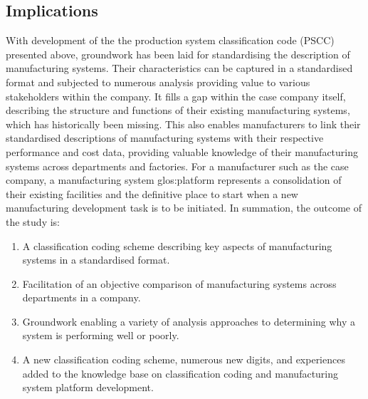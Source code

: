 \subsection{Implications}
With development of the the production system classification code (PSCC) presented above, groundwork has been laid for standardising the description of manufacturing systems.
Their characteristics can be captured in a standardised format and subjected to numerous analysis providing value to various stakeholders within the company. 
It fills a gap within the case company itself, describing the structure and functions of their existing manufacturing systems, which has historically been missing.
This also enables manufacturers to link their standardised descriptions of manufacturing systems with their respective performance and cost data, providing valuable knowledge of their manufacturing systems across departments and factories.
For a manufacturer such as the case company, a manufacturing system \gls{glos:platform} represents a consolidation of their existing facilities and the definitive place to start when a new manufacturing development task is to be initiated.
In summation, the outcome of the study is:
\begin{enumerate}
  \item A classification coding scheme describing key aspects of manufacturing systems in a standardised format.
  \item Facilitation of an objective comparison of manufacturing systems across departments in a company.
  \item Groundwork enabling a variety of analysis approaches to determining why a system is performing well or poorly.
  \item A new classification coding scheme, numerous new digits, and experiences added to the knowledge base on classification coding and manufacturing system platform development.
\end{enumerate}